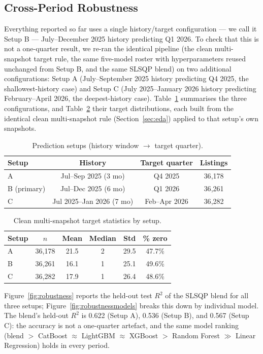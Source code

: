 \documentclass[journal]{IEEEtran}
\begin{document}
\subsection{Cross-Period Robustness}
\label{sec:robustness}
Everything reported so far uses a single history/target configuration --- we
call it Setup B --- July--December 2025 history predicting Q1 2026. To check
that this is not a one-quarter result, we re-ran the identical pipeline (the
clean multi-snapshot target rule, the same five-model roster with
hyperparameters reused unchanged from Setup B, and the same SLSQP blend) on
two additional configurations: Setup A (July--September 2025 history
predicting Q4 2025, the shallowest-history case) and Setup C (July
2025--January 2026 history predicting February--April 2026, the
deepest-history case). Table~\ref{tab:setups} summarises the three
configurations, and Table~\ref{tab:targetstats3} their target distributions,
each built from the identical clean multi-snapshot rule
(Section~\ref{sec:eda}) applied to that setup's own snapshots.

\begin{table}[!t]
\caption{Prediction setups (history window $\to$ target quarter).}
\label{tab:setups}
\centering
\begin{tabular}{lccc}
\toprule
Setup & History & Target quarter & Listings \\
\midrule
A & Jul--Sep 2025 (3 mo) & Q4 2025 & 36{,}178 \\
B (primary) & Jul--Dec 2025 (6 mo) & Q1 2026 & 36{,}261 \\
C & Jul 2025--Jan 2026 (7 mo) & Feb--Apr 2026 & 36{,}282 \\
\bottomrule
\end{tabular}
\end{table}

\begin{table}[!t]
\caption{Clean multi-snapshot target statistics by setup.}
\label{tab:targetstats3}
\centering
\begin{tabular}{lccccc}
\toprule
Setup & $n$ & Mean & Median & Std & \% zero \\
\midrule
A & 36{,}178 & 21.5 & 2 & 29.5 & 47.7\% \\
B & 36{,}261 & 16.1 & 1 & 25.1 & 49.6\% \\
C & 36{,}282 & 17.9 & 1 & 26.4 & 48.6\% \\
\bottomrule
\end{tabular}
\end{table}

Figure~\ref{fig:robustness} reports the held-out test $R^2$ of the SLSQP blend
for all three setups; Figure~\ref{fig:robustnessmodels} breaks this down by
individual model. The blend's held-out $R^2$ is 0.622 (Setup A), 0.536 (Setup
B), and 0.567 (Setup C): the accuracy is not a one-quarter artefact, and the
same model ranking (blend $>$ CatBoost $\approx$ LightGBM $\approx$ XGBoost
$>$ Random Forest $\gg$ Linear Regression) holds in every period.
\end{document}
